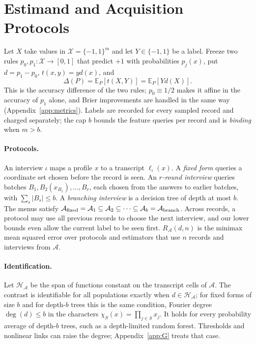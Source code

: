 \documentclass{article}
\newcommand{\E}{\mathbb{E}}
\newcommand{\X}{\mathcal X}
\newcommand{\A}{\mathcal A}
\newcommand{\Hh}{\mathcal H}
\begin{document}
\section{Estimand and Acquisition Protocols}\label{sec:setup}
Let $X$ take values in $\X=\{-1,1\}^m$ and let $Y\in\{-1,1\}$ be a label. Freeze two rules $p_0,p_1:\X\to[0,1]$ that predict $+1$ with probabilities $p_j(x)$, put $d=p_1-p_0$, $t(x,y)=yd(x)$, and
\begin{equation}
 \Delta(P)=\E_P[t(X,Y)]=\E_P[Yd(X)].\label{eq:gain}
\end{equation}
This is the accuracy difference of the two rules; $p_0\equiv1/2$ makes it affine in the accuracy of $p_1$ alone, and Brier improvements are handled in the same way (Appendix~\ref{app:metrics}). Labels are recorded for every sampled record and charged separately; the cap $b$ bounds the feature queries per record and is \emph{binding} when $m>b$.

\paragraph{Protocols.}
An interview $\iota$ maps a profile $x$ to a transcript $\ell_\iota(x)$. A \emph{fixed form} queries a coordinate set chosen before the record is seen. An \emph{$r$-round interview} queries batches $B_1,B_2(x_{B_1}),\ldots,B_r$, each chosen from the answers to earlier batches, with $\sum_s|B_s|\le b$. A \emph{branching interview} is a decision tree of depth at most $b$. The menus satisfy $\A_{\rm fixed}=\A_1\subseteq\A_2\subseteq\cdots\subseteq\A_b=\A_{\rm branch}$. Across records, a protocol may use all previous records to choose the next interview, and our lower bounds even allow the current label to be seen first. $R_\A(d,n)$ is the minimax mean squared error over protocols and estimators that use $n$ records and interviews from $\A$.

\paragraph{Identification.}
Let $\Hh_\A$ be the span of functions constant on the transcript cells of $\A$. The contrast is identifiable for all populations exactly when $d\in\Hh_\A$; for fixed forms of size $b$ and for depth-$b$ trees this is the same condition, Fourier degree $\deg(d)\le b$ in the characters $\chi_S(x)=\prod_{j\in S}x_j$. It holds for every probability average of depth-$b$ trees, such as a depth-limited random forest. Thresholds and nonlinear links can raise the degree; Appendix~\ref{app:G} treats that case.
\end{document}
